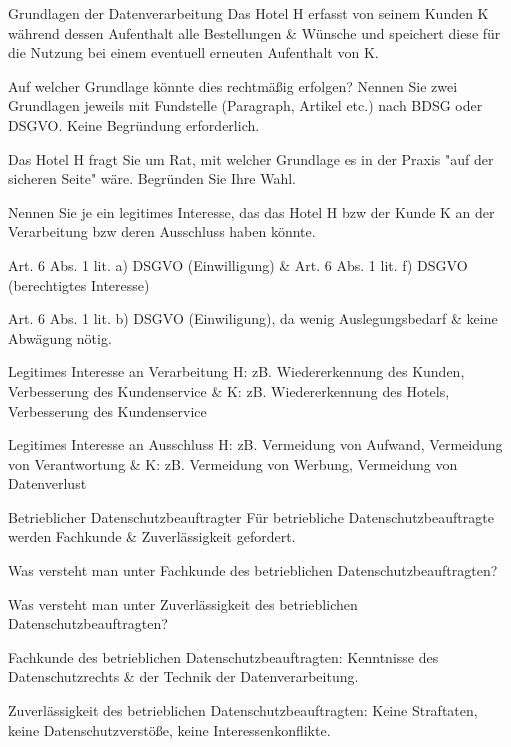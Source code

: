 \documentclass{exercisesheet}
\begin{document}
\begin{eexercises}{Grundlagen der Datenverarbeitung}{
    Das Hotel H erfasst von seinem Kunden K während dessen Aufenthalt alle Bestellungen \& Wünsche und speichert diese für die Nutzung bei einem eventuell erneuten Aufenthalt von K.
  }
  \item Auf welcher Grundlage könnte dies rechtmäßig erfolgen? Nennen Sie zwei Grundlagen jeweils mit Fundstelle (Paragraph, Artikel etc.) nach BDSG oder DSGVO. Keine Begründung erforderlich.
  \item Das Hotel H fragt Sie um Rat, mit welcher Grundlage es in der Praxis "auf der sicheren Seite" wäre. Begründen Sie Ihre Wahl.
  \item Nennen Sie je ein legitimes Interesse, das das Hotel H bzw der Kunde K an der Verarbeitung bzw deren Ausschluss haben könnte.
\end{eexercises}

\begin{solutions}
  \item Art. 6 Abs. 1 lit. a) DSGVO (Einwilligung) \& Art. 6 Abs. 1 lit. f) DSGVO (berechtigtes Interesse)
  \item Art. 6 Abs. 1 lit. b) DSGVO (Einwiligung), da wenig Auslegungsbedarf \& keine Abwägung nötig.
  \item
  Legitimes Interesse an Verarbeitung H: zB. Wiedererkennung des Kunden, Verbesserung des Kundenservice \& K: zB. Wiedererkennung des Hotels, Verbesserung des Kundenservice\par
  Legitimes Interesse an Ausschluss H: zB. Vermeidung von Aufwand, Vermeidung von Verantwortung \& K: zB. Vermeidung von Werbung, Vermeidung von Datenverlust
\end{solutions}

\begin{eexercises}{Betrieblicher Datenschutzbeauftragter}{
    Für betriebliche Datenschutzbeauftragte werden Fachkunde \& Zuverlässigkeit gefordert.
  }
  \item Was versteht man unter Fachkunde des betrieblichen Datenschutzbeauftragten?
  \item Was versteht man unter Zuverlässigkeit des betrieblichen Datenschutzbeauftragten?
\end{eexercises}

\begin{solutions}
  \item Fachkunde des betrieblichen Datenschutzbeauftragten: Kenntnisse des Datenschutzrechts \& der Technik der Datenverarbeitung.
  \item Zuverlässigkeit des betrieblichen Datenschutzbeauftragten: Keine Straftaten, keine Datenschutzverstöße, keine Interessenkonflikte.
\end{solutions}
\end{document}
